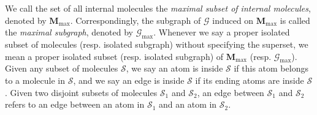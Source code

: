 \documentclass{article}
\newcommand{\1}{\mathds{1}}
\numberwithin{equation}{section}
\renewcommand{\cal}{\mathcal}
\theoremstyle{plain} %
\theoremstyle{remark}
\newtheorem{remark}[theorem]{Remark}
\newcommand{\cor}{\color{red}}
\newcommand{\Pol}{{\mathbf{M}}}
\begin{document}

We call the set of all internal molecules the \emph{maximal subset of internal molecules}, denoted by $\Pol_{\max}$. Correspondingly, the subgraph of $\cal G$ induced on $\Pol_{\max}$ is called the \emph{maximal subgraph}, %
denoted by $\cal G_{\max}$. Whenever we say a proper isolated subset of molecules (resp. isolated subgraph) without specifying the superset, we mean a proper isolated subset (resp. isolated subgraph) of $\Pol_{\max}$ (resp. $\cal G_{\max}$).
Given any subset of molecules $\cal S$, we say an atom is inside $\cal S$ if this atom belongs to a molecule in $\cal S$, and we say an edge is inside $\cal S$ if its ending atoms are inside $\cal S$. Given two disjoint subsets of molecules $\cal S_1$ and $\cal S_2$, an edge between $\cal S_1$ and $\cal S_2$ refers to an edge between an atom in $\cal S_1$ and an atom in $\cal S_2$.


\end{document}
